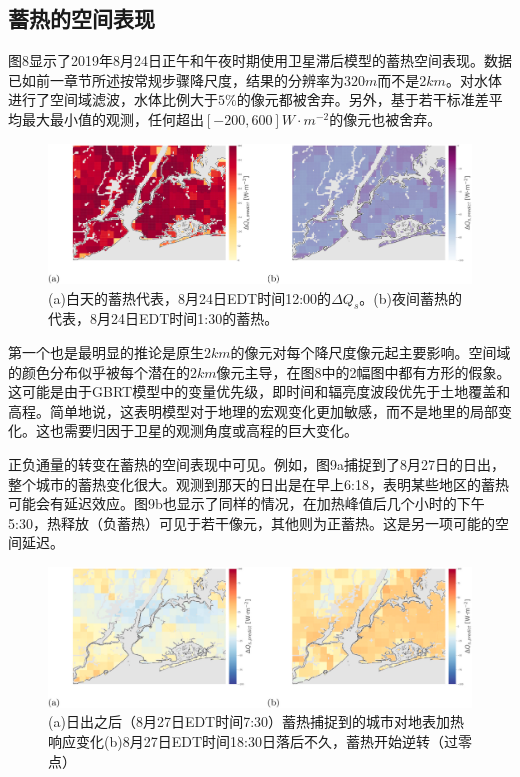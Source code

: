 \documentclass[3p,times]{elsarticle}
\begin{document}
\subsection{蓄热的空间表现}

图8显示了2019年8月24日正午和午夜时期使用卫星滞后模型的蓄热空间表现。数据已如前一章节所述按常规步骤降尺度，结果的分辨率为$320m$而不是$2km$。对水体进行了空间域滤波，水体比例大于$5\%$的像元都被舍弃。另外，基于若干标准差平均最大最小值的观测，任何超出$[-200, 600]W\cdot m^{-2}$的像元也被舍弃。

\begin{figure}[htbp]
    \begin{center}
        \includegraphics[width=\linewidth]{img/图8.png}
    \end{center}
    \caption{(a)白天的蓄热代表，8月24日EDT时间12:00的$\Delta Q_s$。(b)夜间蓄热的代表，8月24日EDT时间1:30的蓄热。}
\end{figure}

第一个也是最明显的推论是原生$2km$的像元对每个降尺度像元起主要影响。空间域的颜色分布似乎被每个潜在的$2km$像元主导，在图8中的2幅图中都有方形的假象。这可能是由于GBRT模型中的变量优先级，即时间和辐亮度波段优先于土地覆盖和高程。简单地说，这表明模型对于地理的宏观变化更加敏感，而不是地里的局部变化。这也需要归因于卫星的观测角度或高程的巨大变化。

正负通量的转变在蓄热的空间表现中可见。例如，图9a捕捉到了8月27日的日出，整个城市的蓄热变化很大。观测到那天的日出是在早上6:18，表明某些地区的蓄热可能会有延迟效应。图9b也显示了同样的情况，在加热峰值后几个小时的下午5:30，热释放（负蓄热）可见于若干像元，其他则为正蓄热。这是另一项可能的空间延迟。

\begin{figure}[htbp]
    \begin{center}
        \includegraphics[width=\linewidth]{img/图9.png}
    \end{center}
    \caption{(a)日出之后（8月27日EDT时间7:30）蓄热捕捉到的城市对地表加热响应变化(b)8月27日EDT时间18:30日落后不久，蓄热开始逆转（过零点）}
\end{figure}
\end{document}
